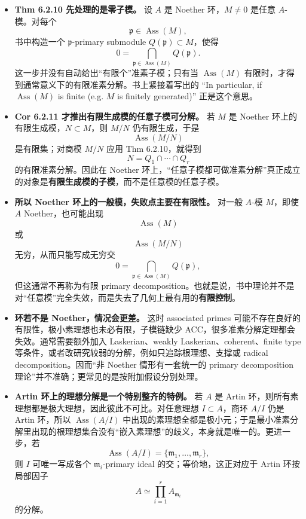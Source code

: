 \documentclass[a4paper]{ctexart}
\theoremstyle{definition}
\theoremstyle{analysis}
\theoremstyle{plain}
\begin{document}
\begin{itemize}
  \item {}\label{rem:primary-thm6210}\textbf{Thm 6.2.10 先处理的是零子模。} 设 \(A\) 是 Noether 环，\(M\neq 0\) 是任意 \(A\)-模。对每个
  \[
    \mathfrak p\in \operatorname{Ass}(M),
  \]
  书中构造一个 \(\mathfrak p\)-primary submodule \(Q(\mathfrak p)\subset M\)，使得
  \[
    0=\bigcap_{\mathfrak p\in \operatorname{Ass}(M)}Q(\mathfrak p).
  \]
  这一步并没有自动给出“有限个”准素子模；只有当 \(\operatorname{Ass}(M)\) 有限时，才得到通常意义下的有限准素分解。书上紧接着写出的
  “In particular, if \(\operatorname{Ass}(M)\) is finite (e.g. \(M\) is finitely generated)” 正是这个意思。

  \item {}\label{rem:primary-cor6211}\textbf{Cor 6.2.11 才推出有限生成模的任意子模可分解。} 若 \(M\) 是 Noether 环上的有限生成模，\(N\subset M\)，则
  \(M/N\) 仍有限生成，于是
  \[
    \operatorname{Ass}(M/N)
  \]
  是有限集；对商模 \(M/N\) 应用 Thm 6.2.10，就得到
  \[
    N=Q_1\cap \cdots \cap Q_r
  \]
  的有限准素分解。因此在 Noether 环上，“任意子模都可做准素分解”真正成立的对象是\textbf{有限生成模的子模}，而不是任意模的任意子模。

  \item {}\label{rem:primary-finiteness-failure}\textbf{所以 Noether 环上的一般模，失败点主要在有限性。} 对一般 \(A\)-模 \(M\)，即使 \(A\) Noether，也可能出现
  \[
    \operatorname{Ass}(M)
  \]
  或
  \[
    \operatorname{Ass}(M/N)
  \]
  无穷，从而只能写成无穷交
  \[
    0=\bigcap_{\mathfrak p\in \operatorname{Ass}(M)}Q(\mathfrak p),
  \]
  但这通常不再称为有限 primary decomposition。也就是说，书中理论并不是对“任意模”完全失效，而是失去了几何上最有用的\textbf{有限控制}。

  \item {}\label{rem:primary-nonnoether}\textbf{环若不是 Noether，情况会更差。} 这时 associated primes 可能不存在良好的有限性，极小素理想也未必有限，子模链缺少 ACC，很多准素分解定理都会失效。通常需要额外加入
  Laskerian、weakly Laskerian、coherent、finite type 等条件，或者改研究较弱的分解，例如只追踪根理想、支撑或 radical decomposition。因而“非 Noether 情形有一套统一的 primary decomposition 理论”并不准确；更常见的是按附加假设分别处理。

  \item {}\label{rem:artin-primary-unique}\textbf{Artin 环上的理想分解是一个特别整齐的特例。} 若 \(A\) 是 Artin 环，则所有素理想都是极大理想，因此彼此不可比。对任意理想 \(I\subset A\)，商环 \(A/I\) 仍是 Artin 环，所以 \(\operatorname{Ass}(A/I)\) 中出现的素理想全都是极小元；于是最小准素分解里出现的根理想集合没有“嵌入素理想”的歧义，本身就是唯一的。更进一步，若
  \[
    \operatorname{Ass}(A/I)=\{\mathfrak m_1,\dots,\mathfrak m_r\},
  \]
  则 \(I\) 可唯一写成各个 \(\mathfrak m_i\)-primary ideal 的交；等价地，这正对应于 Artin 环按局部因子
  \[
    A\simeq \prod_{i=1}^r A_{\mathfrak m_i}
  \]
  的分解。
\end{itemize}
\end{document}
